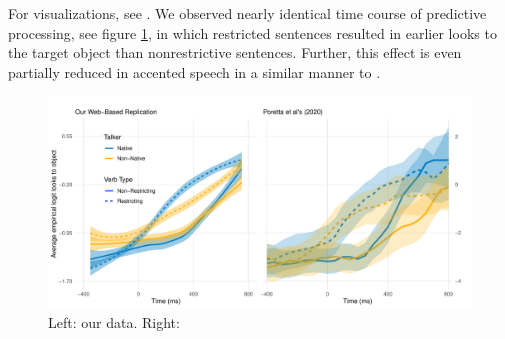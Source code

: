 

For  visualizations, see . We observed nearly identical time course of predictive processing, see figure \ref{fig:smooth}, in which restricted sentences resulted in earlier looks to the target object than nonrestrictive sentences. Further, this effect is even partially reduced in accented speech in a similar manner to \textcite{Porretta_et_al_2020}. 

\begin{figure}[h]
    \centering
    \includegraphics[width=\textwidth]{figures/smooth_comparison_plot.pdf}
    \caption{Left: our data. Right: \textcite{Porretta_et_al_2020}}
    \label{fig:smooth}
\end{figure}